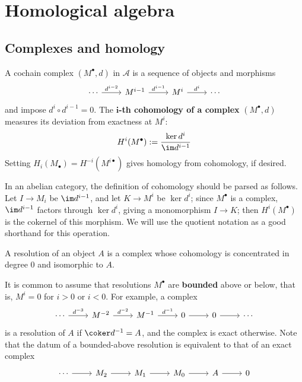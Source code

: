 \chapter{Homological algebra}
\section{Complexes and homology}
A cochain complex $(M^{\bullet},d)$ in $\mathcal{A}$ is a sequence of objects and morphisms
\[\begin{tikzcd}
\cdots\ar[r,"d^{i-2}"]&M^{i-1}\ar[r,"d^{i-1}"]&M^i\ar[r,"d^i"]&\cdots
\end{tikzcd}\]
and impose $d^i\circ d^{i-1}=0$. The \textbf{$\bm{i}$-th cohomology of a complex} $(M^{\bullet},d)$ measures its deviation from exactness at $M^i$:
\[H^i(M^{\bullet}):=\dfrac{\ker d^i}{\im d^{i-1}}\]
Setting $H_i(M_{\bullet})=H^{-i}(M^{i\bullet})$ gives homology from cohomology, if desired.
\begin{remark}
In an abelian category, the definition of cohomology should be parsed as follows. Let $I\to M_i$ be $\im d^{i-1}$, and let $K\to M^i$ be $\ker d^i$; since 
$M^{\bullet}$ is a complex, $\im d^{i-1}$ factors through $\ker d^i$, giving a monomorphism $I\to K$; then $H^i(M^{\bullet})$ is the cokernel of this morphism. We 
will use the quotient notation as a good shorthand for this operation.
\end{remark}
\begin{definition}
A resolution of an object $A$ is a complex whose cohomology is concentrated in degree $0$ and isomorphic to $A$.
\end{definition}
It is common to assume that resolutions $M^{\bullet}$ are \textbf{bounded} above or below,
that is, $M^i=0$ for $i>0$ or $i<0$. For example, a complex
\[\begin{tikzcd}
\cdots\ar[r,"d^{-3}"]&M^{-2}\ar[r,"d^{-2}"]&M^{-1}\ar[r,"d^{-1}"]&0\ar[r]&0\ar[r]&\cdots
\end{tikzcd}\]
is a resolution of $A$ if $\coker d^{-1}=A$, and the complex is exact otherwise. Note that the datum of a bounded-above resolution is equivalent to that of an exact 
complex
\[\begin{tikzcd}
\cdots\ar[r]&M_{2}\ar[r]&M_{1}\ar[r]&M_0\ar[r]&A\ar[r]&0
\end{tikzcd}\]

